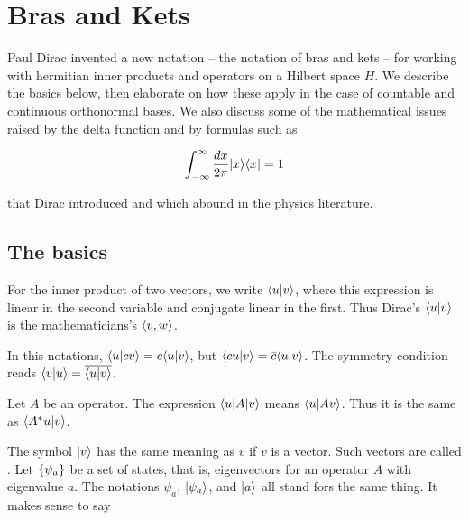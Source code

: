 
\begin{mathmacro}
\newcommand{\bra}[0]{\langle}
\newcommand{\ket}[0]{\rangle}
\newcommand{\id}[0]{\ Id\ }
\newcommand{\set}[1]{\{#1\}}
\end{mathmacro}

\setcounter{section}{8}

\section{Bras and Kets}


Paul Dirac invented a new notation -- the notation of bras and kets -- for working with hermitian inner products and operators on a Hilbert space $H$.  We describe the basics below, then elaborate on how these apply in the case of countable and continuous orthonormal bases.  We also discuss some of the mathematical issues raised by the delta function and by formulas such as

\begin{equation}
\int_{-\infty}^\infty \frac{dx}{2\pi} | x \ket\bra x | = 1
\end{equation}

that Dirac introduced and which abound in the physics literature.

\subsection{The basics}

For the inner product of two vectors, we write $\bra u | v \ket$, where this expression is linear in the second variable and conjugate linear in the first.  Thus Dirac's $\bra u | v \ket$ is the mathematicians's $\bra v, w \ket$.

In this notations, $\bra u | c v\ket = c\bra u | v \ket$, but $\bra cu |  v\ket = \bar c\bra u | v \ket$. The symmetry condition reads $\bra v | u \ket = \overline{\langle u  | v \rangle}$.

Let $A$ be an operator.  The expression $\bra u | A | v \ket$ means $\bra u | Av \ket$.  Thus it is the same as $\bra A^*u | v \ket$.

The symbol $|v\ket$ has the same meaning as $v$ if $v$ is a vector. Such vectors are called .  Let $\set{ \psi_a }$ be a set of states, that is, eigenvectors for an operator $A$ with eigenvalue $a$.  The notations $\psi_a$, $|\psi_a \ket$, and  $|a\ket$ all stand fors the same thing.  It makes sense to say

